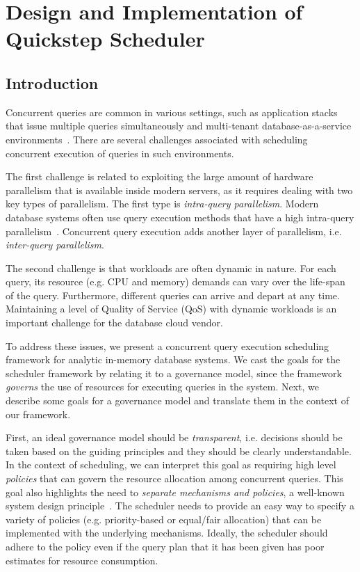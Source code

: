\chapter{Design and Implementation of Quickstep Scheduler}\label{chap:policy}

\section{Introduction}\label{sec:intro}
Concurrent queries are common in various settings, such as application stacks that issue multiple queries simultaneously and multi-tenant database-as-a-service environments~\cite{NarasayyaMSLSC15, NarasayyaDSCC13}.
There are several challenges associated with scheduling  concurrent execution of queries in such environments.

The first challenge is related to exploiting the large amount of hardware parallelism that is available inside modern servers, as it requires dealing with two key types of parallelism.
The first type is \textit{intra-query parallelism}. 
Modern database systems often use query execution methods that have a high intra-query parallelism~\cite{quickstep-storage,morsel,wang2016elastic}.
Concurrent query execution adds another layer of parallelism, i.e. \textit{inter-query parallelism}. 

The second challenge is that workloads are often dynamic in nature. 
For each query, its resource (e.g. CPU and memory) demands can vary over the life-span of the query. 
Furthermore, different queries can arrive and depart at any time. 
Maintaining a  level of Quality of Service (QoS) with dynamic workloads is an important challenge for the database cloud vendor. 

To address these issues, we present a concurrent query execution scheduling framework for analytic in-memory database systems. 
We cast the goals for the scheduler framework by relating it to a governance model, since
the framework \textit{governs} the use of resources for executing queries in the system. 
Next, we describe some goals for a governance model and translate them in the context of our framework.  

First, an ideal governance model should be \textit{transparent}, i.e. decisions should be taken based on the guiding principles and they should be clearly understandable.
In the context of scheduling, we can interpret this goal as requiring high level \textit{policies} that can govern the resource allocation among concurrent queries. 
This goal also highlights the need to \textit{separate mechanisms and policies}, a well-known system design principle~\cite{LampsonS76}.
The scheduler needs to provide an easy way to specify a variety of policies (e.g. priority-based or equal/fair allocation) that can be implemented with the underlying mechanisms.
Ideally, the scheduler should adhere to the policy even if the query plan that it has been given has poor estimates for resource consumption.


